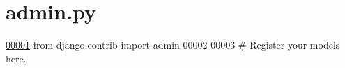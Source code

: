 \hypertarget{admin_8py_source}{}\section{admin.\+py}
\label{admin_8py_source}

\begin{DoxyCode}
\hypertarget{admin_8py_source_l00001}{}\hyperlink{namespacecivilsage_1_1admin}{00001} \textcolor{keyword}{from} django.contrib \textcolor{keyword}{import} admin
00002 
00003 \textcolor{comment}{# Register your models here.}
\end{DoxyCode}
